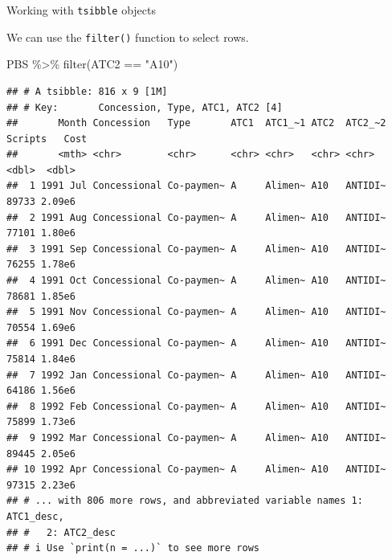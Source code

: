 \documentclass[14pt,ignorenonframetext,aspectratio=169]{beamer}
\newenvironment{Shaded}{\begin{snugshade}}{\end{snugshade}}
\newcommand{\FunctionTok}[1]{\textcolor[rgb]{0.00,0.00,0.00}{#1}}
\newcommand{\NormalTok}[1]{#1}
\newcommand{\SpecialCharTok}[1]{\textcolor[rgb]{0.00,0.00,0.00}{#1}}
\newcommand{\StringTok}[1]{\textcolor[rgb]{0.31,0.60,0.02}{#1}}
\renewenvironment{Shaded}{\color{black}\begin{snugshade}\color{black}}{\end{snugshade}}
\renewenvironment{Shaded}{\color{black}\fontsize{10}{10}\sf\begin{snugshade}\color{black}}{\end{snugshade}}
\begin{document}
\begin{frame}[fragile]{Working with \texttt{tsibble} objects}
\protect\hypertarget{working-with-tsibble-objects-1}{}
\fontsize{12}{14}\sf

We can use the \texttt{filter()} function to select rows.

\fontsize{8}{10}\sf

\begin{Shaded}
\begin{Highlighting}[]
\NormalTok{PBS }\SpecialCharTok{\%\textgreater{}\%}
  \FunctionTok{filter}\NormalTok{(ATC2 }\SpecialCharTok{==} \StringTok{"A10"}\NormalTok{)}
\end{Highlighting}
\end{Shaded}

\begin{verbatim}
## # A tsibble: 816 x 9 [1M]
## # Key:       Concession, Type, ATC1, ATC2 [4]
##       Month Concession   Type       ATC1  ATC1_~1 ATC2  ATC2_~2 Scripts   Cost
##       <mth> <chr>        <chr>      <chr> <chr>   <chr> <chr>     <dbl>  <dbl>
##  1 1991 Jul Concessional Co-paymen~ A     Alimen~ A10   ANTIDI~   89733 2.09e6
##  2 1991 Aug Concessional Co-paymen~ A     Alimen~ A10   ANTIDI~   77101 1.80e6
##  3 1991 Sep Concessional Co-paymen~ A     Alimen~ A10   ANTIDI~   76255 1.78e6
##  4 1991 Oct Concessional Co-paymen~ A     Alimen~ A10   ANTIDI~   78681 1.85e6
##  5 1991 Nov Concessional Co-paymen~ A     Alimen~ A10   ANTIDI~   70554 1.69e6
##  6 1991 Dec Concessional Co-paymen~ A     Alimen~ A10   ANTIDI~   75814 1.84e6
##  7 1992 Jan Concessional Co-paymen~ A     Alimen~ A10   ANTIDI~   64186 1.56e6
##  8 1992 Feb Concessional Co-paymen~ A     Alimen~ A10   ANTIDI~   75899 1.73e6
##  9 1992 Mar Concessional Co-paymen~ A     Alimen~ A10   ANTIDI~   89445 2.05e6
## 10 1992 Apr Concessional Co-paymen~ A     Alimen~ A10   ANTIDI~   97315 2.23e6
## # ... with 806 more rows, and abbreviated variable names 1: ATC1_desc,
## #   2: ATC2_desc
## # i Use `print(n = ...)` to see more rows
\end{verbatim}
\end{frame}
\end{document}

